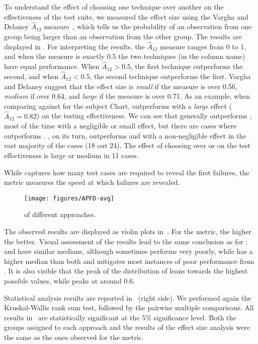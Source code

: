 To understand the effect of choosing one technique over another on the effectiveness of the test suite, we measured the effect size using the Vargha and Delaney $\hat{A}_{12}$ measure~\citep{vargha2000critique}, which tells us the probability of an observation from one group being larger than an observation from the other group.
The results are displayed in . For interpreting the results, the $\hat{A}_{12}$ measure ranges from 0 to 1, and when the measure is exactly 0.5 the two techniques (in the column name) have equal performance. When $\hat{A}_{12}>0.5$, the first technique outperforms the second, and when $\hat{A}_{12}<0.5$, the second technique outperforms the first.
Vargha and Delaney suggest that the effect size is \textit{small} if the measure is over 0.56, \textit{medium} if over 0.64, and \textit{large} if the measure is over 0.71. As an example, when comparing \fz against \rnd for the subject Chart, \fz outperforms \rnd with a \textit{large} effect ($\hat{A}_{12}=0.82$) on the testing effectiveness.  
%
We can see that \ek generally outperforms \fs, most of the time with a negligible or small effect, but there are cases where \fs outperforms \ek.
\fz, on its turn, outperforms \ek and \fs with a non-negligible effect in the vast majority of the cases (18 out 24). The effect of choosing \fz over \ek or \fs on the test effectiveness is large or medium in 11 cases.


While \ttff captures how many test cases are required to reveal the first failures, 
the \apfd metric measures the speed at which failures are revealed.

\begin{figure}[h]
  \centering
  \texttt{[image: figures/APFD-avg]}
  \caption{\apfd of different approaches.}
  \label{fig:apfd_avg}
  \vspace{-3mm}
\end{figure}
The observed \apfd results are displayed as violin plots in~.
For the \apfd metric, the higher
the better.
Visual assessment of the results lead to the same conclusion as for \pttff:
\ek and \fs have similar medians, although \fs sometimes performs very poorly, while \fz has a higher median than both and mitigates most instances of poor performance from \fs.
It is also visible that the peak of the distribution of \fz leans towards the highest possible values, while \ek peaks at around 0.6.

Statistical analysis results are reported in~ (right side). 
We performed again the Kruskal-Wallis rank sum test, followed by the pairwise multiple
comparisons.
All  results in~ are statistically
significant at the 5\% significance level.
Both the groups assigned to each approach 
and the results of the effect size analysis were the same as the ones observed for the \ttff metric.



